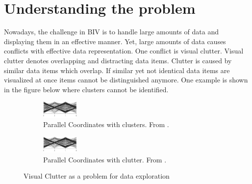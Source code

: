  \section{Understanding the problem}\label{problems}
 Nowadays, the challenge in BIV is to handle large amounts of data and displaying them in an effective manner. Yet, large amounts of data causes conflicts with effective data representation. One conflict is visual clutter. Visual clutter denotes overlapping and distracting data items. Clutter is caused by similar data items which overlap. If similar yet not identical data items are visualized at once items cannot be distinguished anymore. One example is shown in the figure below where clusters cannot be identified.
 
 \begin{figure}[H]
 \centering
 \begin{subfigure}[b]{0.25\textwidth}
     \includegraphics[width=0.20\textwidth]{src/images/PC1}
     \caption{Parallel Coordinates with clusters. From \cite{Tatu2010}.}
 \end{subfigure}
 \hfill
 \begin{subfigure}[b]{0.25\textwidth}
     \includegraphics[width=0.20\textwidth]{src/images/PC1}
     \caption{Parallel Coordinates with clutter. From \cite{Tatu2010}.}
 \end{subfigure}
 \caption{Visual Clutter as a problem for data exploration}
 \label{fig:visual clutter}
 \end{figure}
 

